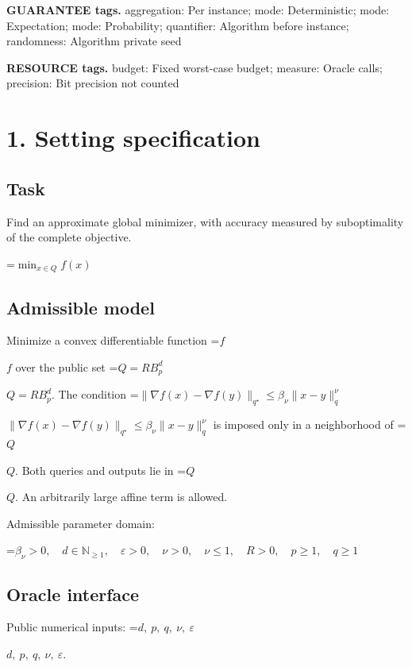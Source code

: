 \documentclass[10pt,a4paper]{article}
\newcommand{\AtlasMath}[1]{\par\begingroup\centering\setbox0=\hbox{$\displaystyle #1$}\ifdim\wd0>1.4\linewidth\typeout{ATLAS WIDE FORMULA: \the\wd0}\fi\ifdim\wd0>\linewidth\resizebox{\linewidth}{!}{\box0}\else\box0\fi\par\endgroup}
\newcommand{\AtlasInlineMath}[1]{\begingroup\setbox0=\hbox{$#1$}\ifdim\wd0>.4\linewidth\endgroup\AtlasMath{#1}\else\endgroup$#1$\fi}
\begin{document}
\textbf{GUARANTEE tags.} aggregation: Per instance; mode: Deterministic; mode: Expectation; mode: Probability; quantifier: Algorithm before instance; randomness: Algorithm private seed



\textbf{RESOURCE tags.} budget: Fixed worst-case budget; measure: Oracle calls; precision: Bit precision not counted



\section{1. Setting specification}


\subsection{Task}


Find an approximate global minimizer, with accuracy measured by suboptimality of the complete objective.




\AtlasMath{\min_{x\in Q}f(x)}




\subsection{Admissible model}


Minimize a convex differentiable function \AtlasInlineMath{f} over the public set \AtlasInlineMath{Q=RB_p^d}. The condition \AtlasInlineMath{\|\nabla f(x)-\nabla f(y)\|_{q^\star}\le\beta_\nu\|x-y\|_q^\nu} is imposed only in a neighborhood of \AtlasInlineMath{Q}. Both queries and outputs lie in \AtlasInlineMath{Q}. An arbitrarily large affine term is allowed.



Admissible parameter domain:


\AtlasMath{\beta_\nu>0,\quad d\in\mathbb{N}_{\ge1},\quad \varepsilon>0,\quad \nu>0,\quad \nu\le1,\quad R>0,\quad p\ge1,\quad q\ge1}




\subsection{Oracle interface}


Public numerical inputs: \AtlasInlineMath{d,\ p,\ q,\ \nu,\ \varepsilon}.
\end{document}
